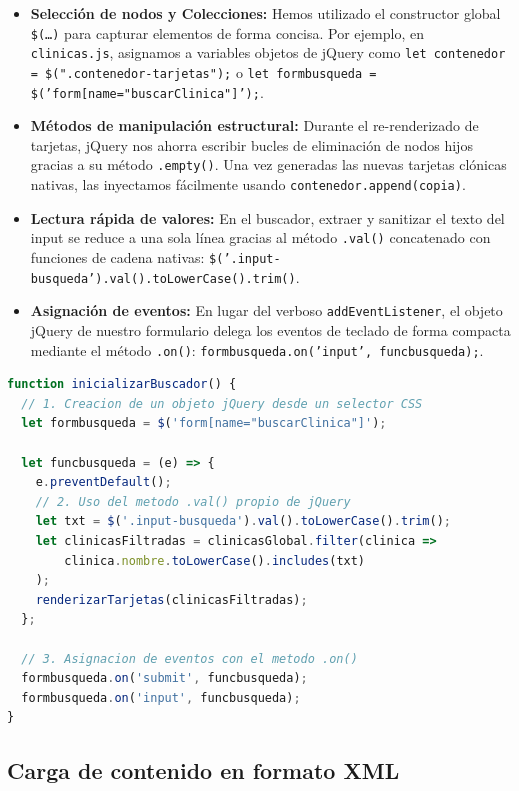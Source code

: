 \documentclass[11pt]{article}
\begin{document}
\begin{itemize}
    \item \textbf{Selección de nodos y Colecciones:} Hemos utilizado el constructor global \texttt{\$(\ldots)} para capturar elementos de forma concisa. Por ejemplo, en \texttt{clinicas.js}, asignamos a variables objetos de jQuery como \texttt{let contenedor = \$(".contenedor-tarjetas");} o \texttt{let formbusqueda = \$('form[name="buscarClinica"]');}.
    \item \textbf{Métodos de manipulación estructural:} Durante el re-renderizado de tarjetas, jQuery nos ahorra escribir bucles de eliminación de nodos hijos gracias a su método \texttt{.empty()}. Una vez generadas las nuevas tarjetas clónicas nativas, las inyectamos fácilmente usando \texttt{contenedor.append(copia)}.
    \item \textbf{Lectura rápida de valores:} En el buscador, extraer y sanitizar el texto del input se reduce a una sola línea gracias al método \texttt{.val()} concatenado con funciones de cadena nativas: \texttt{\$('.input-busqueda').val().toLowerCase().trim()}.
    \item \textbf{Asignación de eventos:} En lugar del verboso \texttt{addEventListener}, el objeto jQuery de nuestro formulario delega los eventos de teclado de forma compacta mediante el método \texttt{.on()}: \texttt{formbusqueda.on('input', funcbusqueda);}.
\end{itemize}

\begin{lstlisting}[language=JavaScript, caption=Manipulación del DOM y eventos mediante jQuery en clinicas.js]
function inicializarBuscador() {
  // 1. Creacion de un objeto jQuery desde un selector CSS
  let formbusqueda = $('form[name="buscarClinica"]');

  let funcbusqueda = (e) => {
    e.preventDefault();
    // 2. Uso del metodo .val() propio de jQuery
    let txt = $('.input-busqueda').val().toLowerCase().trim();
    let clinicasFiltradas = clinicasGlobal.filter(clinica =>
        clinica.nombre.toLowerCase().includes(txt)
    );
    renderizarTarjetas(clinicasFiltradas);
  };

  // 3. Asignacion de eventos con el metodo .on()
  formbusqueda.on('submit', funcbusqueda);
  formbusqueda.on('input', funcbusqueda);
}
\end{lstlisting}

\clearpage

\subsection{Carga de contenido en formato XML}
\end{document}

